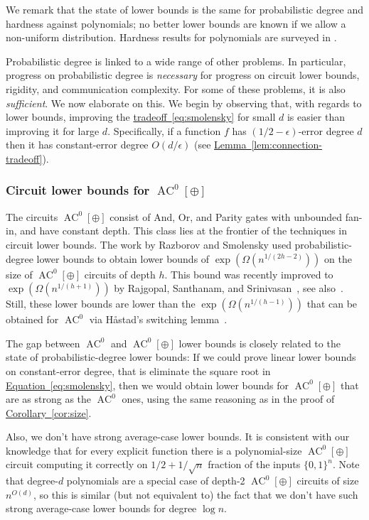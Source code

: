 \documentclass[11pt]{article}
\newcommand{\expref}[2]{\texorpdfstring{\hyperref[#2]{#1~\ref{#2}}}{#1~\ref{#2}}}
\newcommand{\expeqref}[2]{\texorpdfstring{\hyperref[#2]{#1~\eqref{#2}}}{#1~\eqref{#2}}}
\DeclareMathOperator{\AC}{\mathrm{AC}}  %
\newcommand{\zo}{\{0, 1\}}
\newcommand{\e}{\epsilon}
\begin{document}
We remark that the state of lower bounds is the same for probabilistic
degree and hardness against %
polynomials; no  %
better lower bounds are
known if we allow a non-uniform distribution. Hardness results for
polynomials are surveyed in %
\cite[Chapter 1]{viola-FTTCS09}.   %

\medskip

Probabilistic degree is linked to a wide range of other problems.
In particular, progress on probabilistic degree is \emph{necessary}
for progress on circuit lower bounds, rigidity, and communication
complexity. For some of these problems, it is also \emph{sufficient}.
We now elaborate on this. We begin by observing that, with regards
to lower bounds, improving the
%
%
%
\expeqref{tradeoff}{eq:smolensky} %
for small $d$ is easier than improving it for large $d$. Specifically,
if a function $f$ has $(1/2-\e)$-error degree $d$ then it has constant-error
degree $O(d/\e)$ (see \expref{Lemma}{lem:connection-tradeoff}).

%
\subsubsection{Circuit lower bounds for \texorpdfstring{$\AC^{0}[\oplus]$}{AC0(+)}}

The circuits $\AC^{0}[\oplus]$ consist of And, Or, and Parity gates
with unbounded fan-in, and have constant depth. This class lies at
the frontier of the techniques in circuit lower bounds. The
%
%
work  %
by Razborov and Smolensky used probabilistic-degree lower bounds to
obtain lower bounds of $\exp(\Omega(n^{1/(2h-2)}))$ on the size of
$\AC^{0}[\oplus]$ circuits of depth $h$. This bound was recently
improved to $\exp(\Omega(n^{1/(h+1)}))$ by Rajgopal, Santhanam, and
Srinivasan~\cite{DBLP:conf/mfcs/RajgopalS018}, see 
also~\cite{DBLP:conf/coco/OliveiraS019}.
Still, these lower bounds are lower than the $\exp(\Omega(n^{1/(h-1)}))$
that can be obtained for $\AC^{0}$ via
%
%
H{\aa}stad's switching lemma~\cite{Has87}.  %

The gap between $\AC^{0}$ and $\AC^{0}[\oplus]$ lower bounds is closely
related to the state of probabilistic-degree lower bounds: If we could
prove linear lower bounds on constant-error degree, that is eliminate
the square root in 
\expeqref{Equation}{eq:smolensky}, %
then we would obtain lower
bounds for $\AC^{0}[\oplus]$ that are as strong as the $\AC^{0}$ ones,
using the same reasoning
as  %
in the proof of \expref{Corollary}{cor:size}.

Also, we don't have strong average-case lower bounds. It is consistent
with our knowledge that for every explicit function there is a polynomial-size
$\AC^{0}[\oplus]$ circuit computing it correctly on $1/2+1/\sqrt{n}$
fraction of the inputs $\zo^{n}$. Note that degree-$d$ polynomials
are a special case of depth-2 $\AC^{0}[\oplus]$ circuits of size $n^{O(d)}$,
so this is similar (but not equivalent to) the fact that we don't
have such strong average-case lower bounds for degree $\log n$.
\end{document}
